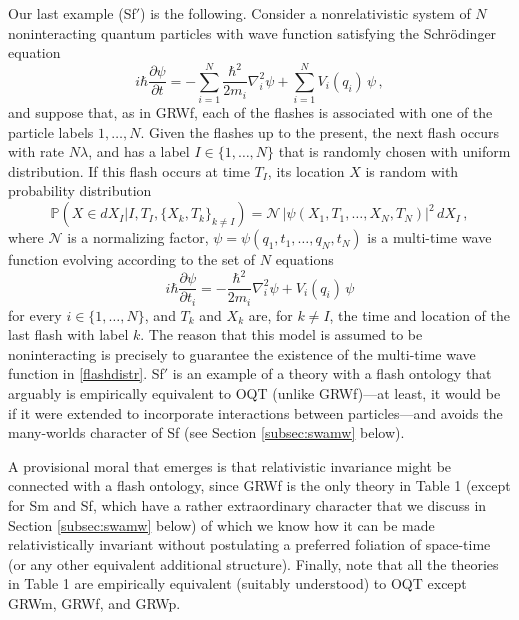 \documentclass[12pt]{article}
\begin{document}
Our last example ({\sf Sf$'$}) is the following.
Consider a nonrelativistic system of $N$ noninteracting quantum
particles with wave function satisfying the Schr\"odinger equation
\begin{equation}\label{schr}
  i\hbar \frac{\partial \psi}{\partial t} = -\sum_{i=1}^N
  \frac{\hbar^2}{2m_i} \nabla_i^2 \psi + \sum_{i=1}^N V_i(q_i)
  \, \psi\,,
\end{equation}
and suppose that, as in {\sf GRWf}, each of the flashes is associated with
one of the particle labels $1, \ldots, N$. 
Given the flashes up to the present, the next flash occurs with
rate $N\lambda$, and  has a label $I \in \{1, \ldots, N\}$ that is randomly chosen with uniform distribution. If this flash occurs at time $T_I$, 
its location $X$ is random with probability distribution
\begin{equation}\label{flashdistr}
  \mathbb{P}(X\in d X_I| I, T_I, \{X_k,T_k\}_{k\neq I}) = \mathcal{N} \, \bigl|\psi(X_1, T_1, \ldots, 
  X_N,T_N) \bigr|^2 \, d X_I \,, 
\end{equation}
where $\mathcal{N}$ is a normalizing factor, $\psi= \psi(q_1,t_1,
\ldots, q_N,t_N)$ is a multi-time wave function evolving according
to the set of $N$ equations
\begin{equation}\label{multitime}
  i\hbar \frac{\partial \psi}{\partial t_i} = -\frac{\hbar^2}{2m_i}
  \nabla_i^2 \psi + V_i(q_i) \, \psi
\end{equation}
for every $i \in \{1,\ldots, N\}$, and $T_k$ and $X_k$ are, for $k \neq I$,
the time and location of the last flash with label $k$. The reason that
this model is assumed to be noninteracting is precisely to guarantee the
existence of the multi-time wave function in \eqref{flashdistr}. {\sf Sf$'$}
is an example of a theory with a flash ontology that arguably is
empirically equivalent to {\sf OQT} (unlike {\sf GRWf})---at least, it
would be if it were extended to incorporate interactions between
particles---and avoids the many-worlds character of {\sf Sf} (see Section
\ref{subsec:swamw} below).

A provisional moral that emerges is that relativistic invariance might be
connected with a flash ontology, since {\sf GRWf} is the only theory in
Table 1 (except for {\sf Sm} and {\sf Sf}, which have a rather
extraordinary character that we discuss in Section \ref{subsec:swamw}
below) of which we know how it can be made relativistically invariant
without postulating a preferred foliation of space-time (or any other
equivalent additional structure). Finally, note that all the theories in
Table 1 are empirically equivalent (suitably understood) to {\sf OQT}
except {\sf GRWm}, {\sf GRWf}, and {\sf GRWp}.
\end{document}
